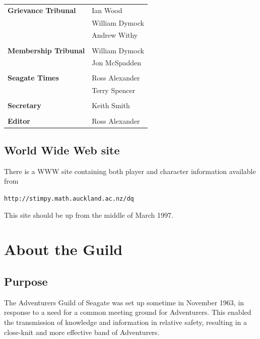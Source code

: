 \documentclass[twoside,a4paper]{article}
\begin{document}
\begin{multicols}{2}
\bigskip

\begin{tabular}{ll}
\textbf{Grievance Tribunal} & Ian Wood \\
	& William Dymock \\
	& Andrew Withy \\
\\
\textbf{Membership Tribunal} & William Dymock \\
	& Jon McSpadden \\
\\
\textbf{Seagate Times} & Ross Alexander \\
	& Terry Spencer \\
\\
\textbf{Secretary} & Keith Smith \\
\\
\textbf{Editor} & Ross Alexander \\
\end{tabular}

\bigskip

\subsection{World Wide Web site}

There is a WWW site containing both player and character
information available from
\begin{flushleft}
\hspace{1cm}\texttt{http://stimpy.math.auckland.ac.nz/dq}
\end{flushleft}
This site should be up from the middle of March 1997.

\newpage

%
%

\section{About the Guild}

\subsection{Purpose}

The Adventurers Guild of Seagate was set up sometime in November 1963,
in response to a need for a common meeting ground for Adventurers.
This enabled the transmission of knowledge and information in relative
safety, resulting in a close-knit and more effective band of
Adventurers.


\end{multicols}
\end{document}

